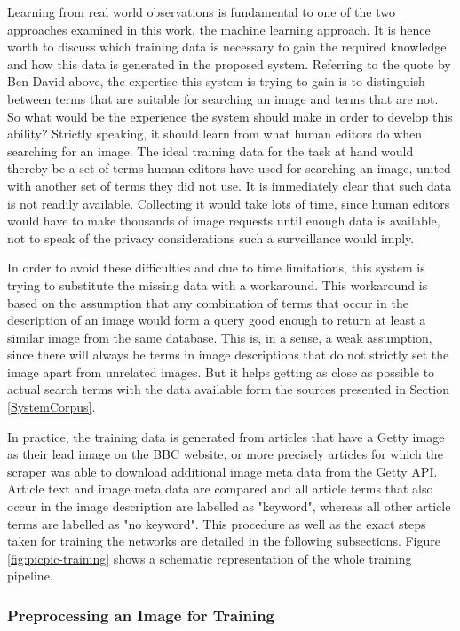 \documentclass[11pt,a4paper,twoside]{article}
\begin{document}
\noindent Learning from real world observations is fundamental to one of the two approaches examined in this work, the machine learning approach. It is hence worth to discuss which training data is necessary to gain the required knowledge and how this data is generated in the proposed system. Referring to the quote by Ben-David above, the expertise this system is trying to gain is to distinguish between terms that are suitable for searching an image and terms that are not. So what would be the experience the system should make in order to develop this ability? Strictly speaking, it should learn from what human editors do when searching for an image. The ideal training data for the task at hand would thereby be a set of terms human editors have used for searching an image, united with another set of terms they did not use. It is immediately clear that such data is not readily available. Collecting it would take lots of time, since human editors would have to make thousands of image requests until enough data is available, not to speak of the privacy considerations such a surveillance would imply.

In order to avoid these difficulties and due to time limitations, this system is trying to substitute the missing data with a workaround. This workaround is based on the assumption that any combination of terms that occur in the description of an image would form a query good enough to return at least a similar image from the same database. This is, in a sense, a weak assumption, since there will always be terms in image descriptions that do not strictly set the image apart from unrelated images. But it helps getting as close as possible to actual search terms with the data available form the sources presented in Section \ref{SystemCorpus}.

In practice, the training data is generated from articles that have a Getty image as their lead image on the BBC website, or more precisely articles for which the scraper was able to download additional image meta data from the Getty API. Article text and image meta data are compared and all article terms that also occur in the image description are labelled as "keyword", whereas all other article terms are labelled as "no keyword". This procedure as well as the exact steps taken for training the networks are detailed in the following subsections. Figure \ref{fig:picpic-training} shows a schematic representation of the whole training pipeline.

\subsubsection{Preprocessing an Image for Training} \label{SystemTrainPreprocess}
\end{document}
